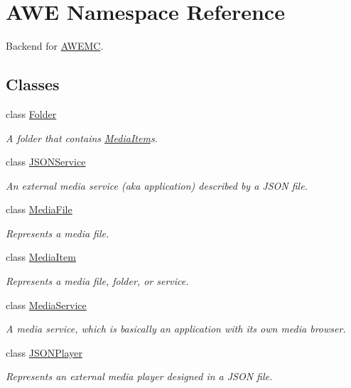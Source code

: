 \hypertarget{namespace_a_w_e}{\section{A\-W\-E Namespace Reference}
\label{namespace_a_w_e}
}


Backend for \hyperlink{class_a_w_e_1_1_a_w_e_m_c}{A\-W\-E\-M\-C}.  


\subsection*{Classes}
\begin{DoxyCompactItemize}
\item 
class \hyperlink{class_a_w_e_1_1_folder}{Folder}
\begin{DoxyCompactList}\small\item\em A folder that contains {\ttfamily \hyperlink{class_a_w_e_1_1_media_item}{Media\-Item}}s. \end{DoxyCompactList}\item 
class \hyperlink{class_a_w_e_1_1_j_s_o_n_service}{J\-S\-O\-N\-Service}
\begin{DoxyCompactList}\small\item\em An external media service (aka application) described by a J\-S\-O\-N file. \end{DoxyCompactList}\item 
class \hyperlink{class_a_w_e_1_1_media_file}{Media\-File}
\begin{DoxyCompactList}\small\item\em Represents a media file. \end{DoxyCompactList}\item 
class \hyperlink{class_a_w_e_1_1_media_item}{Media\-Item}
\begin{DoxyCompactList}\small\item\em Represents a media file, folder, or service. \end{DoxyCompactList}\item 
class \hyperlink{class_a_w_e_1_1_media_service}{Media\-Service}
\begin{DoxyCompactList}\small\item\em A media service, which is basically an application with its own media browser. \end{DoxyCompactList}\item 
class \hyperlink{class_a_w_e_1_1_j_s_o_n_player}{J\-S\-O\-N\-Player}
\begin{DoxyCompactList}\small\item\em Represents an external media player designed in a J\-S\-O\-N file. \end{DoxyCompactList}\item 

\end{DoxyCompactItemize}
